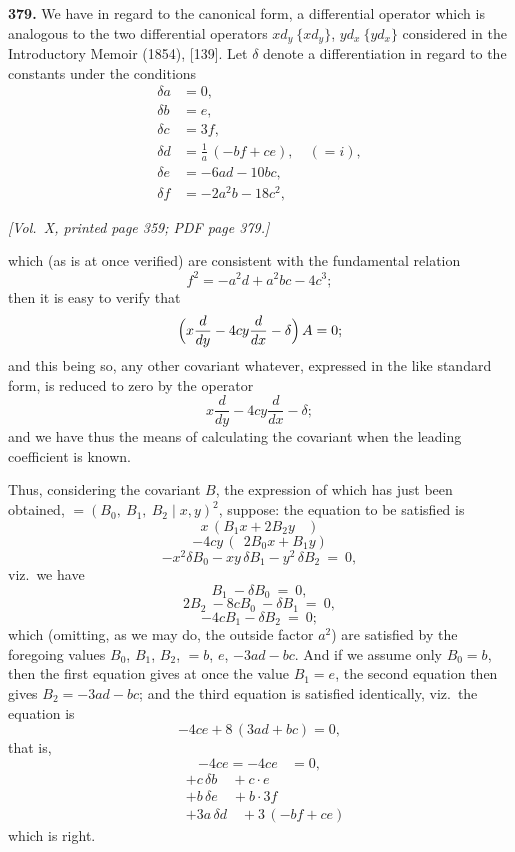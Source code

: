 \documentclass[11pt]{article}
\begin{document}
\medskip

\noindent\textbf{379.} We have in regard to the canonical form, a differential operator which is analogous to the two differential operators $x d_{y}\ \{x d_{y}\}$, $y d_{x}\ \{y d_{x}\}$ considered in the Introductory Memoir (1854), [139]. Let $\delta$ denote a differentiation in regard to the constants under the conditions
\begin{align*}
\delta a &= 0, \\
\delta b &= e, \\
\delta c &= 3f, \\
\delta d &= \tfrac{1}{a}\,(-bf+ce),\quad (=i), \\
\delta e &= -6ad-10bc, \\
\delta f &= -2a^{2}b-18c^{2},
\end{align*}

\newpage

\noindent\textit{[Vol.~X, printed page 359; PDF page 379.]}

\medskip

which (as is at once verified) are consistent with the fundamental relation
\[
f^{2}=-a^{2}d+a^{2}bc-4c^{3};
\]
then it is easy to verify that
\[
\Bigl(x\frac{d}{dy}-4cy\frac{d}{dx}-\delta\Bigr)\,A=0;
\]
and this being so, any other covariant whatever, expressed in the like standard form, is reduced to zero by the operator
\[
x\frac{d}{dy}-4cy\frac{d}{dx}-\delta;
\]
and we have thus the means of calculating the covariant when the leading coefficient is known.

\medskip

Thus, considering the covariant $B$, the expression of which has just been obtained, $=(B_{0},\ B_{1},\ B_{2} \mid x,y)^{2}$, suppose: the equation to be satisfied is
\[
x\,(B_{1}x+2B_{2}y\ \ \ \ )
\]
\[
-4cy\,(\ \ 2B_{0}x+B_{1}y)
\]
\[
-x^{2}\delta B_{0}-xy\,\delta B_{1}-y^{2}\,\delta B_{2}\ =\ 0,
\]
viz.\ we have
\[
B_{1}\ -\delta B_{0}\ =\ 0,
\]
\[
2B_{2}\ -8cB_{0}\ -\delta B_{1}\ =\ 0,
\]
\[
-4cB_{1}-\delta B_{2}\ =\ 0;
\]
which (omitting, as we may do, the outside factor $a^{2}$) are satisfied by the foregoing values $B_{0}$, $B_{1}$, $B_{2}$, $=b$, $e$, $-3ad-bc$. And if we assume only $B_{0}=b$, then the first equation gives at once the value $B_{1}=e$, the second equation then gives $B_{2}=-3ad-bc$; and the third equation is satisfied identically, viz.\ the equation is
\[
-4ce+8\,(3ad+bc)=0,
\]
that is,
\[
-4ce=-4ce\ \ \ \ =0,
\]
\begin{align*}
&+c\,\delta b\quad +c\cdot e \\
&+b\,\delta e\quad +b\cdot 3f \\
&+3a\,\delta d\quad +3\,(-bf+ce)
\end{align*}
which is right.
\end{document}
